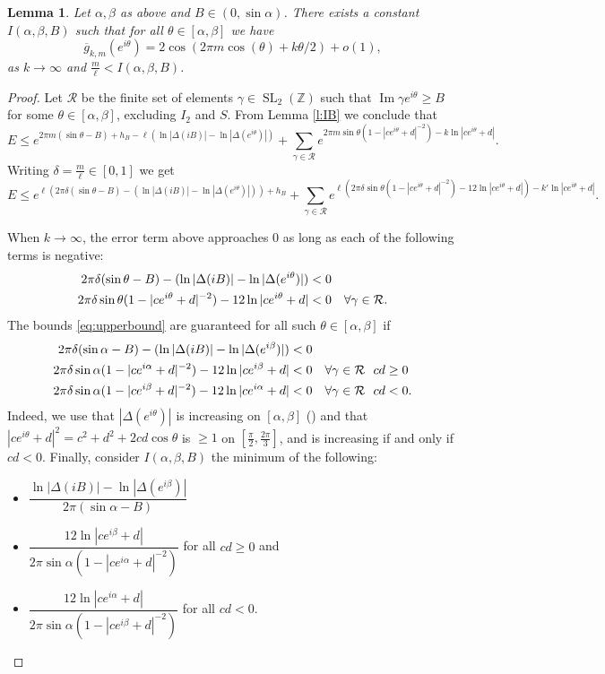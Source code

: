 \documentclass[12pt]{amsart}
\theoremstyle{plain} %
\newtheorem{lemma}      [theorem]{Lemma}
\theoremstyle{definition}
\theoremstyle{remark}
\numberwithin{equation}{section}
\newcommand{\SL}{\operatorname{SL}}
\renewcommand{\Im}{\operatorname{Im}}
\begin{document}
\begin{lemma}\label{l:miller-approx-arc}
Let $\alpha, \beta$ as above and $B\in (0,\sin \alpha)$.
There exists a constant $I(\alpha,\beta,B)$ such that 
for all $\theta\in [\alpha,\beta]$ we have
\[\overline{g}_{k,m}(e^{i \theta})=2\cos\left(2\pi m\cos
(\theta)+k\theta/2\right)+o(1),\]
as $k\to \infty$ and $\frac{m}{\ell}<I(\alpha,\beta,B)$.
\end{lemma}
\begin{proof}
Let $\mathcal{R}$ be the finite set of elements $\gamma\in \SL_2(\mathbb{Z})$ such that $\Im \gamma e^{i\theta}\geq B$ for some $\theta\in [\alpha,\beta]$, excluding $I_2$ and $S$.
From Lemma \ref{l:IB} we conclude that 
\[E\leq e^{2\pi m (\sin\theta-B)+h_B -\ell
  (\ln|\Delta(iB)|-\ln|\Delta(e^{i\theta})|)}+\sum_{\gamma\in \mathcal{R}} e^{2\pi
  m\sin\theta(1-|ce^{i\theta}+d|^{-2})-k\ln|ce^{i\theta}+d|}.\]
Writing $\delta=\frac{m}{\ell}\in [0,1]$ we get
\[E\leq e^{\ell(2\pi \delta (\sin\theta-B) -
  (\ln|\Delta(iB)|-\ln|\Delta(e^{i\theta})|))+h_B}+\sum_{\gamma\in \mathcal{R}} e^{\ell(2\pi
  \delta \sin\theta(1-|ce^{i\theta}+d|^{-2})-12\ln|ce^{i\theta}+d|)-k'\ln|ce^{i\theta}+d|}.\]

When $k\to\infty$, the error term above approaches 0 as long as
each of the following terms is negative:
\begin{align}\label{eq:upperbound}
2\pi \delta (\sin\theta-B) -
  (\ln|\Delta(iB)|-\ln|\Delta(e^{i\theta})|)&<0\\
  2\pi
  \delta \sin\theta(1-|ce^{i\theta}+d|^{-2})-12\ln|ce^{i\theta}+d|&<0\ \ \ \forall \gamma\in \mathcal{R}.\notag
\end{align}
The bounds \eqref{eq:upperbound} are guaranteed for
all such $\theta\in [\alpha,\beta]$ if
\begin{align}\label{eq:upperboundab}
2\pi \delta (\sin\alpha-B) -
  (\ln|\Delta(iB)|-\ln|\Delta(e^{i\beta})|)&<0\\
  2\pi
  \delta\sin\alpha(1-|ce^{i\alpha}+d|^{-2})-12\ln|ce^{i\beta}+d|&<0\ \ \ \forall \gamma\in \mathcal{R}\ \ cd\geq 0\notag\\
  2\pi
  \delta \sin\alpha(1-|ce^{i\beta}+d|^{-2})-12\ln|ce^{i\alpha}+d|&<0\ \ \ \forall \gamma\in \mathcal{R}\ \ cd<0.\notag
\end{align}
Indeed, we use that $|\Delta(e^{i\theta})|$ is increasing on
$[\alpha,\beta]$ (\cite[Prop 3.1]{raveh:miller}) and that
$|ce^{i\theta}+d|^2=c^2+d^2+2cd\cos\theta$ is $\geq 1$ on $[\frac{\pi}{2},\frac{2\pi}{3}]$, and is increasing if and
only if $cd<0$. Finally, consider $I(\alpha, \beta, B)$ the
minimum of the following:
\begin{itemize}
\item $\dfrac{\ln|\Delta(iB)|-\ln|\Delta(e^{i\beta})|}{2\pi
  (\sin\alpha-B)}$
\item $\dfrac{12\ln|ce^{i\beta}+d|}{2\pi\sin \alpha
  (1-|ce^{i\alpha}+d|^{-2})}$ for all $cd\geq 0$ and
\item $\dfrac{12\ln|ce^{i\alpha}+d|}{2\pi\sin \alpha (1-|ce^{i\beta}+d|^{-2})}$ for all $cd< 0$.
\end{itemize}
\end{proof}
\end{document}
